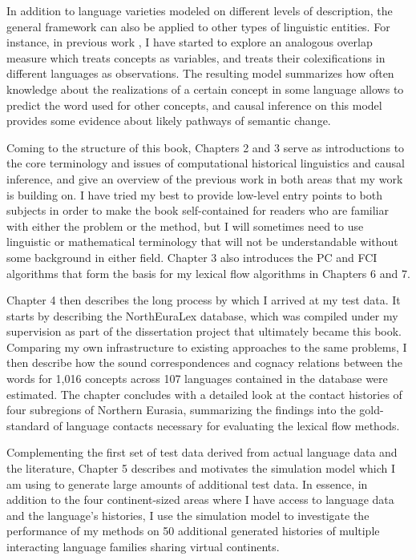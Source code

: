 In addition to language varieties modeled on different levels of description, the general framework can also be applied to other types of linguistic entities. For instance, in previous work \citep{dellert2016b}, I have started to explore an analogous overlap measure which treats concepts as variables, and treats their colexifications in different languages as observations. The resulting model summarizes how often knowledge about the realizations of a certain concept in some language allows to predict the word used for other concepts, and causal inference on this model provides some evidence about likely pathways of semantic change.

Coming to the structure of this book, Chapters 2 and 3 serve as introductions to the core terminology and issues of computational historical linguistics and causal inference, and give an overview of the previous work in both areas that my work is building on. I have tried my best to provide low-level entry points to both subjects in order to make the book self-contained for readers who are familiar with either the problem or the method, but I will sometimes need to use linguistic or mathematical terminology that will not be understandable without some background in either field. Chapter 3 also introduces the PC and FCI algorithms that form the basis for my lexical flow algorithms in Chapters 6 and 7.

Chapter 4 then describes the long process by which I arrived at my test data. It starts by describing the NorthEuraLex database, which was compiled under my supervision as part of the dissertation project that ultimately became this book. Comparing my own infrastructure to existing approaches to the same problems, I then describe how the sound correspondences and cognacy relations between the words for 1,016 concepts across 107 languages contained in the database were estimated. The chapter concludes with a detailed look at the contact histories of four subregions of Northern Eurasia, summarizing the findings into the gold-standard of language contacts necessary for evaluating the lexical flow methods.

Complementing the first set of test data derived from actual language data and the literature, Chapter 5 describes and motivates the simulation model which I am using to generate large amounts of additional test data. In essence, in addition to the four continent-sized areas where I have access to language data and the language's histories, I use the simulation model to investigate the performance of my methods on 50 additional generated histories of multiple interacting language families sharing virtual continents.

